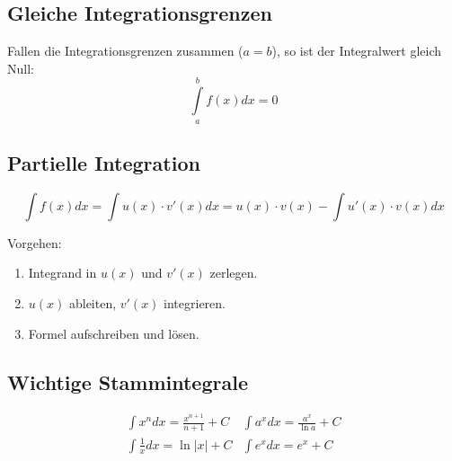 \documentclass[10pt,a4paper,twocolumn]{article}
\begin{document}
\subsection{Gleiche Integrationsgrenzen}
Fallen die Integrationsgrenzen zusammen ($a=b$), so ist der Integralwert gleich Null:
\[
\int\limits_{a}^{b}f(x)dx=0
\]

\subsection{Partielle Integration}
\[
\int f(x)dx=\int u(x)\cdot v'(x)dx=u(x)\cdot v(x)-\int u'(x)\cdot v(x)dx
\]

Vorgehen:
\begin{enumerate}
\item Integrand in $u(x)$ und $v'(x)$ zerlegen.
\item $u(x)$ ableiten, $v'(x)$ integrieren.
\item Formel aufschreiben und lösen.
\end{enumerate}

\subsection{Wichtige Stammintegrale}
\renewcommand*{\arraystretch}{2}
\[
\begin{array}{cc}

	\int x^ndx=\frac{x^{n+1}}{n+1}+C & \int a^xdx=\frac{a^x}{\ln a}+C \\
	\int\frac{1}{x}dx=\ln |x|+C & \int e^xdx=e^x+C \\
\end{array}
\]
\renewcommand*{\arraystretch}{1}
\end{document}
